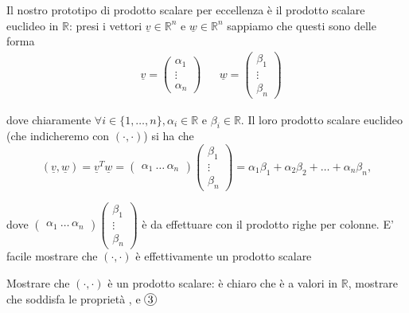 Il nostro prototipo di prodotto scalare per eccellenza è il prodotto scalare euclideo in $\mathbb{R}$: presi i vettori $\underline{v} \in \mathbb{R}^n$ e $\underline{w} \in \mathbb{R}^n$ sappiamo che questi sono delle forma
\begin{align}
	&\underline{v} = \begin{pmatrix} \alpha_1 \\ \vdots \\ \alpha_n \end{pmatrix} & &\underline{w} = \begin{pmatrix} \beta_1 \\ \vdots \\ \beta_n \end{pmatrix}
\end{align}

dove chiaramente $\forall i \in \{1, \ldots, n \}, \alpha_i \in \mathbb{R}$ e $\beta_i \in \mathbb{R}$. Il loro prodotto scalare euclideo (che indicheremo con $(\cdot, \cdot)$) si ha che
$$
	(\underline{v}, \underline{w}) = \underline{v}^T \underline{w} = \begin{pmatrix} \alpha_1 \ \ldots \, \alpha_n \end{pmatrix} \begin{pmatrix} \beta_1 \\ \vdots \\ \beta_n \end{pmatrix} = \alpha_1 \beta_1 + \alpha_2 \beta_2 + \ldots + \alpha_n \beta_n,
$$

dove $\begin{pmatrix} \alpha_1 \ \ldots \, \alpha_n \end{pmatrix} \begin{pmatrix} \beta_1 \\ \vdots \\ \beta_n \end{pmatrix}$ è da effettuare con il prodotto righe per colonne. E' facile mostrare che $(\cdot, \cdot)$ è effettivamente un prodotto scalare

\begin{exercise}
	\label{ex:3.1}
	Mostrare che $(\cdot, \cdot)$ è un prodotto scalare: è chiaro che è a valori in $\mathbb{R}$, mostrare che soddisfa le proprietà ,  e $\circled{3}$
\end{exercise}

